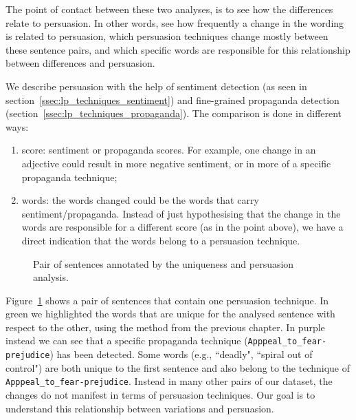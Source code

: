 The point of contact between these two analyses, is to see how the differences relate to persuasion. In other words, see how frequently a change in the wording is related to persuasion, which persuasion techniques change mostly between these sentence pairs, and which specific words are responsible for this relationship between differences and persuasion.

We describe persuasion with the help of sentiment detection (as seen in section~\ref{ssec:lp_techniques_sentiment}) and fine-grained propaganda detection (section~\ref{ssec:lp_techniques_propaganda}).
The comparison is done in different ways:
\begin{enumerate}
    \item score: sentiment or propaganda scores. For example, one change in an adjective could result in more negative sentiment, or in more of a specific propaganda technique;
    \item words: the words changed could be the words that carry sentiment/propaganda. Instead of just hypothesising that the change in the words are responsible for a different score (as in the point above), we have a direct indication that the words belong to a persuasion technique.
\end{enumerate}

\begin{figure}[!htbp]
    \centering
    \caption{Pair of sentences annotated by the uniqueness and persuasion analysis.}
    \label{fig:annotated_clique_data}
\end{figure}

Figure~\ref{fig:annotated_clique_data} shows a pair of sentences that contain one persuasion technique.
In green we highlighted the words that are unique for the analysed sentence with respect to the other, using the method from the previous chapter.
In purple instead we can see that a specific propaganda technique (\texttt{Apppeal\_to\_fear-prejudice}) has been detected.
Some words (e.g., ``deadly", ``spiral out of control") are both unique to the first sentence and also belong to the technique of \texttt{Apppeal\_to\_fear-prejudice}. Instead in many other pairs of our dataset, the changes do not manifest in terms of persuasion techniques.
Our goal is to understand this relationship between variations and persuasion.

